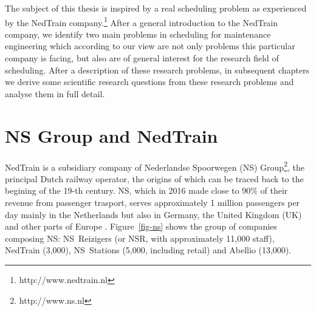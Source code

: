 
	The subject of this thesis is inspired by a real scheduling problem as experienced by the NedTrain company.\footnote{http://www.nedtrain.nl}
	After a general introduction to the NedTrain company, we identify two main problems in scheduling for maintenance 
	engineering which according to our view are not only problems this particular company is facing, 
	but also are of general interest for the research field of scheduling.
	After a description of these research problems, 
	in subsequent chapters we derive some scientific research questions from these research problems and analyse them in full detail.  

\section{NS Group and NedTrain}

		NedTrain is a subsidiary company of Nederlandse Spoorwegen (NS) Group\footnote{http://www.ns.nl}, 
		the principal Dutch railway operator, 
		the origins of which can be traced back to the begining of the 19-th century.
		NS, which in 2016 made close to 90\% of their revenue from passenger trasport,
		serves approximately 1 million passengers per day mainly in the Netherlands but also in Germany, 
		the United Kingdom (UK) and other parts of Europe \cite{NS2016}. 
		Figure~\ref{fig-ns} shows the group of companies composing NS: 
		NS~Reizigers (or NSR, with approximately 11,000 staff), NedTrain (3,000), 
		NS~Stations (5,000, including retail) and Abellio (13,000).

